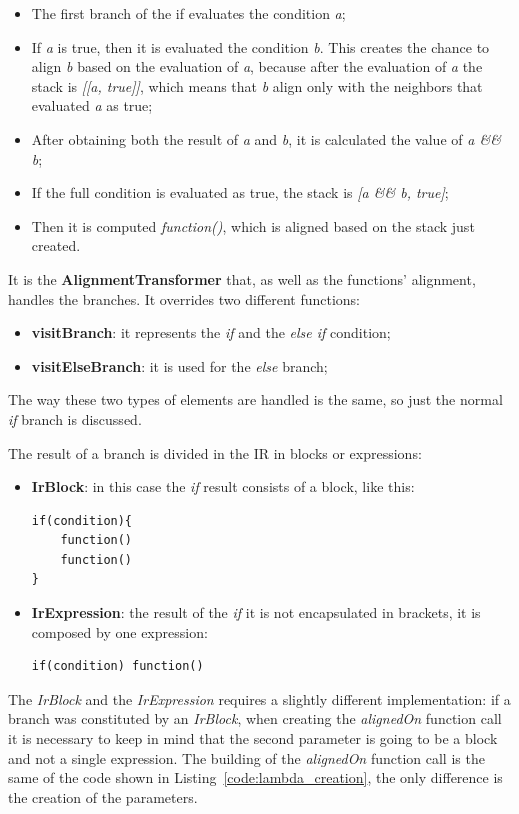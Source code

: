 \begin{itemize}
    \item The first branch of the if evaluates the condition \textit{a};
    \item If \textit{a} is true, then it is evaluated the condition \textit{b}. This creates the chance to align \textit{b} based on the evaluation of \textit{a}, because after the evaluation of \textit{a} the stack is \textit{[[a, true]]}, which means that \textit{b} align only with the neighbors that evaluated \textit{a} as true;
    \item After obtaining both the result of \textit{a} and \textit{b}, it is calculated the value of \textit{a \&\& b};
    \item If the full condition is evaluated as true, the stack is \textit{[a \&\& b, true]};
    \item Then it is computed \textit{function()}, which is aligned based on the stack just created.
\end{itemize}

It is the \textbf{AlignmentTransformer} that, as well as the functions' alignment, handles the branches. It overrides two different functions:
\begin{itemize}
    \item \textbf{visitBranch}: it represents the \textit{if} and the \textit{else if} condition;
    \item \textbf{visitElseBranch}: it is used for the \textit{else} branch;
\end{itemize}
The way these two types of elements are handled is the same, so just the normal \textit{if} branch is discussed.

The result of a branch is divided in the IR in blocks or expressions:
\begin{itemize}
    \item \textbf{IrBlock}: in this case the \textit{if} result consists of a block, like this:
\begin{lstlisting}
if(condition){
    function()
    function()
}
\end{lstlisting} 
    \item \textbf{IrExpression}: the result of the \textit{if} it is not encapsulated in brackets, it is composed by one expression:
\begin{lstlisting}
if(condition) function()
\end{lstlisting}
\end{itemize}

The \textit{IrBlock} and the \textit{IrExpression} requires a slightly different implementation: if a branch was constituted by an \textit{IrBlock}, when creating the \textit{alignedOn} function call it is necessary to keep in mind that the second parameter is going to be a block and not a single expression.\newline
The building of the \textit{alignedOn} function call is the same of the code shown in Listing~\ref{code:lambda_creation}, the only difference is the creation of the parameters. 

